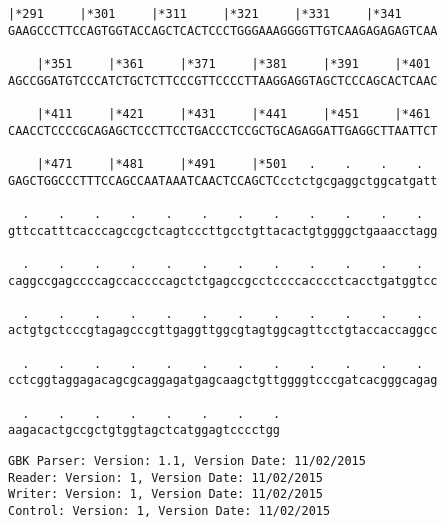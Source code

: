 \documentclass{article}
\begin{document}
\begin{Verbatim}[fontfamily=courier]
    |*291     |*301     |*311     |*321     |*331     |*341 
GAAGCCCTTCCAGTGGTACCAGCTCACTCCCTGGGAAAGGGGTTGTCAAGAGAGAGTCAA

    |*351     |*361     |*371     |*381     |*391     |*401 
AGCCGGATGTCCCATCTGCTCTTCCCGTTCCCCTTAAGGAGGTAGCTCCCAGCACTCAAC

    |*411     |*421     |*431     |*441     |*451     |*461 
CAACCTCCCCGCAGAGCTCCCTTCCTGACCCTCCGCTGCAGAGGATTGAGGCTTAATTCT

    |*471     |*481     |*491     |*501   .    .    .    .  
GAGCTGGCCCTTTCCAGCCAATAAATCAACTCCAGCTCcctctgcgaggctggcatgatt

  .    .    .    .    .    .    .    .    .    .    .    .  
gttccatttcacccagccgctcagtcccttgcctgttacactgtggggctgaaacctagg

  .    .    .    .    .    .    .    .    .    .    .    .  
caggccgagccccagccaccccagctctgagccgcctccccacccctcacctgatggtcc

  .    .    .    .    .    .    .    .    .    .    .    .  
actgtgctcccgtagagcccgttgaggttggcgtagtggcagttcctgtaccaccaggcc

  .    .    .    .    .    .    .    .    .    .    .    .  
cctcggtaggagacagcgcaggagatgagcaagctgttggggtcccgatcacgggcagag

  .    .    .    .    .    .    .    .
aagacactgccgctgtggtagctcatggagtcccctgg
\end{Verbatim}
\newpage
\begin{Verbatim}[fontfamily=courier]
GBK Parser: Version: 1.1, Version Date: 11/02/2015
Reader: Version: 1, Version Date: 11/02/2015
Writer: Version: 1, Version Date: 11/02/2015
Control: Version: 1, Version Date: 11/02/2015
\end{Verbatim}
\end{document}
